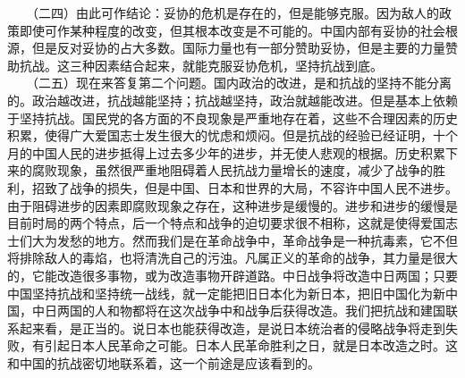 \documentclass[cn,11pt,chinese]{elegantbook}
\begin{document}
　　（二四）由此可作结论：妥协的危机是存在的，但是能够克服。因为敌人的政策即使可作某种程度的改变，但其根本改变是不可能的。中国内部有妥协的社会根源，但是反对妥协的占大多数。国际力量也有一部分赞助妥协，但是主要的力量赞助抗战。这三种因素结合起来，就能克服妥协危机，坚持抗战到底。\\
　　（二五）现在来答复第二个问题。国内政治的改进，是和抗战的坚持不能分离的。政治越改进，抗战越能坚持；抗战越坚持，政治就越能改进。但是基本上依赖于坚持抗战。国民党的各方面的不良现象是严重地存在着，这些不合理因素的历史积累，使得广大爱国志士发生很大的忧虑和烦闷。但是抗战的经验已经证明，十个月的中国人民的进步抵得上过去多少年的进步，并无使人悲观的根据。历史积累下来的腐败现象，虽然很严重地阻碍着人民抗战力量增长的速度，减少了战争的胜利，招致了战争的损失，但是中国、日本和世界的大局，不容许中国人民不进步。由于阻碍进步的因素即腐败现象之存在，这种进步是缓慢的。进步和进步的缓慢是目前时局的两个特点，后一个特点和战争的迫切要求很不相称，这就是使得爱国志士们大为发愁的地方。然而我们是在革命战争中，革命战争是一种抗毒素，它不但将排除敌人的毒焰，也将清洗自己的污浊。凡属正义的革命的战争，其力量是很大的，它能改造很多事物，或为改造事物开辟道路。中日战争将改造中日两国；只要中国坚持抗战和坚持统一战线，就一定能把旧日本化为新日本，把旧中国化为新中国，中日两国的人和物都将在这次战争中和战争后获得改造。我们把抗战和建国联系起来看，是正当的。说日本也能获得改造，是说日本统治者的侵略战争将走到失败，有引起日本人民革命之可能。日本人民革命胜利之日，就是日本改造之时。这和中国的抗战密切地联系着，这一个前途是应该看到的。\\
\end{document}
